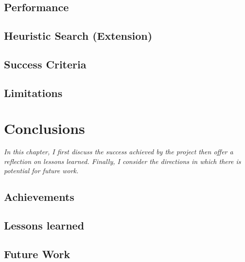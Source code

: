 \documentclass[12pt,a4paper,twoside,openright]{report}
\begin{document}
\section{Performance}

\section{Heuristic Search (Extension)}

\section{Success Criteria}

\section{Limitations}



\chapter{Conclusions}
\textit{In this chapter, I first discuss the success achieved by the project then offer a reflection on lessons learned. Finally, I consider the directions in which there is potential for future work.}
\section{Achievements}

\section{Lessons learned}

\section{Future Work}

\cite{finkensiep_modeling_2021}


\nocite{*}
% 



\end{document}
